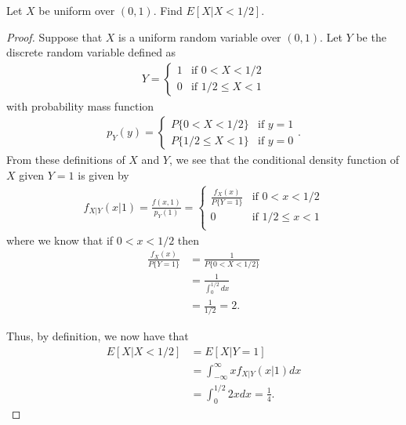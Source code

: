 \begin{problem}{3.14}
  Let $X$ be uniform over $(0, 1)$. Find $E[X|X<1/2]$.
\end{problem}

\begin{proof}
  Suppose that $X$ is a uniform random variable over $(0, 1)$. Let $Y$
  be the discrete random variable defined as
  \begin{align*}
    Y =
    \begin{cases}
      1 & \text{if $0 < X < 1/2$} \\
      0 & \text{if $1/2 \leq X < 1$}
    \end{cases}
  \end{align*}
  with probability mass function
  \begin{align*}
    p_Y(y) =
    \begin{cases}
      P\{0 < X < 1/2\} & \text{if $y = 1$} \\
      P\{1/2 \leq X < 1\} & \text{if $y = 0$}
    \end{cases}.
  \end{align*}
  From these definitions of $X$ and $Y$, we see that the conditional density function of $X$ given $Y=1$ is
  given by
  \begin{align*}
    f_{X|Y}(x|1) = \frac{f(x, 1)}{p_Y(1)} =
    \begin{cases}
      \frac{f_X(x)}{P\{Y=1\}} & \text{if $0 < x < 1/2$}\\
      0 & \text{if $1/2 \leq x < 1$} \\
    \end{cases}
  \end{align*}
  where we know that if $0 < x < 1/2$ then
  \begin{align*}
    \frac{f_X(x)}{P\{Y=1\}}
    &= \frac{1}{P\{0 < X < 1/2\}}\\
    &= \frac{1}{\int_{0}^{1/2}dx} \\
    &= \frac{1}{1/2} = 2.
  \end{align*}

  Thus, by definition, we now have that
  \begin{align*}
    E[X | X < 1/2] &= E[X | Y = 1] \\
    &= \int_{-\infty}^\infty x f_{X|Y}(x|1) dx \\
    &= \int_{0}^{1/2} 2x dx = \frac{1}{4}.
  \end{align*}
\end{proof}
\newpage
